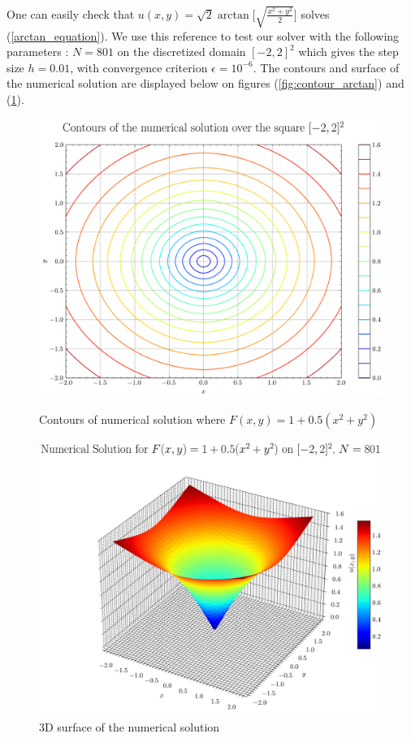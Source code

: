 \documentclass[11pt]{article}
\theoremstyle{definition}
\theoremstyle{remark}
\begin{document}
One can easily check that $u(x,y)=\sqrt{2}\arctan\Big[\sqrt{\frac{x^2+y^2}{2}}\Big]$ solves (\ref{arctan_equation}). We use this reference to test our solver with the following parameters : $N=801$ on the discretized domain $[-2,2]^2$ which gives the step size $h=0.01$, with convergence criterion $\epsilon=10^{-6}$. The contours and surface of the numerical solution are displayed below on figures (\ref{fig:contour_arctan}) and (\ref{fig:surface_arctan}). \\

\begin{figure}[h]
  \centering
  \begin{minipage}{0.45\textwidth}
    \centering
    \includegraphics[width=\linewidth]{plots/contour_plot_arctan.png}
    \caption{Contours of numerical solution where $F(x,y)=1+0.5(x^2+y^2)$}
    \label{fig:contour_arctan}
  \end{minipage}
  \hfill
  \begin{minipage}{0.45\textwidth}
    \centering
    \includegraphics[width=\linewidth]{plots/solution_3d_surface_arctan.png}
    \caption{3D surface of the numerical solution}
    \label{fig:surface_arctan}
  \end{minipage}
\end{figure}
\end{document}
